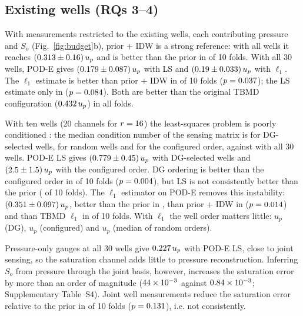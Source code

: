 \subsection{Existing wells (RQs 3--4)}
\label{sec:res_wells}
With measurements restricted to the \NWells{} existing wells, each contributing pressure and $S_o$ (Fig.~\ref{fig:budget}b), prior + IDW is a strong reference: with all wells it reaches $(0.313\pm0.16)\,u_p$ and is better than the prior in \WPTwoIdwVsPriorWellsJointThirtyWins{} of 10 folds. With all 30 wells, POD-E gives $(0.179\pm0.087)\,u_p$ with LS and $(0.19\pm0.033)\,u_p$ with $\ell_1$. The $\ell_1$ estimate is better than prior + IDW in \WPTwoPodELVsIdwWellsJointThirtyWins{} of 10 folds ($p=0.037$); the LS estimate only in \WPTwoPodELsVsIdwWellsJointThirtyWins{} ($p=0.084$). Both are better than the original TBMD configuration ($0.432\,u_p$) in all folds.

With ten wells (20 channels for $r=16$) the least-squares problem is poorly conditioned \cite{peherstorfer2020}: the median condition number of the sensing matrix is \CondDgTen{} for DG-selected wells, \CondRandTen{} for random wells and \CondConfTen{} for the configured order, against \CondDgThirty{} with all 30 wells. POD-E LS gives $(0.779\pm0.45)\,u_p$ with DG-selected wells and $(2.5\pm1.5)\,u_p$ with the configured order. DG ordering is better than the configured order in \WPTwoDgVsConfiguredPodELsWellsJointTenWins{} of 10 folds ($p=0.004$), but LS is not consistently better than the prior (\WPTwoPodELsVsPriorWellsJointTenWins{} of 10 folds). The $\ell_1$ estimator on POD-E removes this instability: $(0.351\pm0.097)\,u_p$, better than the prior in \WPTwoPodELVsPriorWellsJointTenWins{}, than prior + IDW in \WPTwoPodELVsIdwWellsJointTenWins{} ($p=0.014$) and than TBMD $\ell_1$ in \WPTwoPodELVsTbmdLWellsJointTenWins{} of 10 folds. With $\ell_1$ the well order matters little: \LoneDgTen{} $u_p$ (DG), \LoneConfTen{} $u_p$ (configured) and \LoneRandTen{} $u_p$ (median of random orders).

Pressure-only gauges at all 30 wells give $0.227\,u_p$ with POD-E LS, close to joint sensing, so the saturation channel adds little to pressure reconstruction. Inferring $S_o$ from pressure through the joint basis, however, increases the saturation error by more than an order of magnitude ($44\times10^{-3}$ against $0.84\times10^{-3}$; Supplementary Table~S4). Joint well measurements reduce the saturation error relative to the prior in \WPTwoPodELsVsPriorSoWellsJointThirtyWins{} of 10 folds ($p=0.131$), i.e. not consistently.

